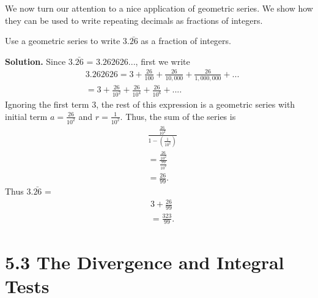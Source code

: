 \documentclass{report}
\begin{document}
    \pagebreak \bigbreak \noindent 
    We now turn our attention to a nice application of geometric series. We show how they can be used to write repeating decimals as fractions of integers.
    \bigbreak \noindent 
    \begin{eg}
        Use a geometric series to write  $3.\bar{26}$ as a fraction of integers.
    \end{eg}
    \bigbreak \noindent 
    \textbf{Solution.} Since $3.\bar{26}$ = $3.262626...$, first we write 
    \begin{align*}
        &3.262626 = 3 + \frac{26}{100} + \frac{26}{10,000} + \frac{26}{1,000,000} + ...  \\
        &= 3+ \frac{26}{10^{2}} + \frac{26}{10^{4}} + \frac{26}{10^{6}} + ... 
    .\end{align*}
    \bigbreak \noindent 
    Ignoring the first term $3$, the rest of this expression is a geometric series with initial term $a = \frac{26}{10^{2}} $ and $r=\frac{1}{10^{2}} $. Thus, the sum of the series is
    \begin{align*}
        &\frac{\frac{26}{10^{2}}}{1-\left(\frac{1}{10^{2}}\right)} \\
        &=\frac{\frac{26}{10^{2}}}{\frac{99}{10^{2}}} \\
        &=\frac{26}{99}
    .\end{align*}
    \bigbreak \noindent 
    Thus $3.\bar{26}$ = 
    \begin{align*}
        &3 + \frac{26}{99} \\
        &=\frac{323}{99}
    .\end{align*}

    \pagebreak \bigbreak \noindent 
    \section*{5.3 The Divergence and Integral Tests}
    \bigbreak \noindent 
\end{document}
